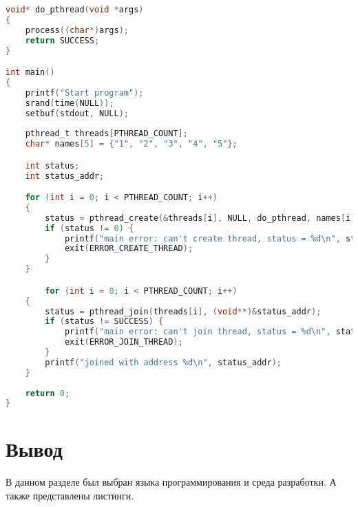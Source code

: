 \begin{lstlisting}[language=c, label=some-code, caption=Анализируемая программа]
void* do_pthread(void *args) 
{
	process((char*)args);
	return SUCCESS;
}

int main() 
{
	printf("Start program");
	srand(time(NULL));
	setbuf(stdout, NULL);
	
	pthread_t threads[PTHREAD_COUNT];
	char* names[5] = {"1", "2", "3", "4", "5"};

	int status;
	int status_addr;

	for (int i = 0; i < PTHREAD_COUNT; i++)
	{
		status = pthread_create(&threads[i], NULL, do_pthread, names[i]);
		if (status != 0) {
			printf("main error: can't create thread, status = %d\n", status);
			exit(ERROR_CREATE_THREAD);
		}
	}

		for (int i = 0; i < PTHREAD_COUNT; i++)
	{
		status = pthread_join(threads[i], (void**)&status_addr);
		if (status != SUCCESS) {
			printf("main error: can't join thread, status = %d\n", status);
			exit(ERROR_JOIN_THREAD);
		}
		printf("joined with address %d\n", status_addr);
	}
	
	return 0;
}
\end{lstlisting}









\section{Вывод}

В данном разделе был выбран языка программирования и среда разработки.
А также представлены листинги.